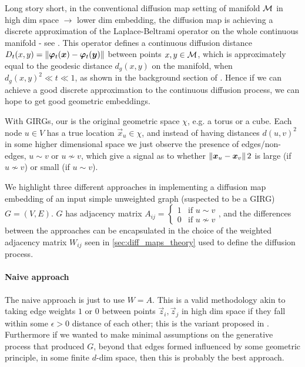 Long story short, in the conventional diffusion map setting of manifold $\mathcal{M}$ in high dim space $\to$ lower dim embedding, the diffusion map is achieving a discrete approximation of the Laplace-Beltrami operator on the whole continuous manifold - see \cite{singer2006graph}. This operator defines a continuous diffusion distance $D_t(x, y) = \left\lVert \bm{\varphi}_t(\bm{x}) - \bm{\varphi}_t(\bm{y})\right\rVert$ between points $x, y \in \mathcal{M}$, which is approximately equal to the geodesic distance $d_g(x, y)$ on the manifold, when $d_g(x, y)^2 \ll t \ll 1$, as shown in the background section of \cite{berry2018iterated}. Hence if we can achieve a good discrete approximation to the continuous diffusion process, we can hope to get good geometric embeddings.

With GIRGs, our  is the original geometric space $\chi$, e.g. a torus or a cube. Each node $u \in V$ has a true location $\vec{x}_u \in \chi$, and instead of having distances $d(u, v)^2$ in some higher dimensional space we just observe the presence of edges/non-edges, $u \sim v$ or $u \nsim v$, which give a signal as to whether $\left\lVert \bm{x}_u - \bm{x}_v\right\rVert2$ is large (if $u \nsim v$) or small (if $u \sim v$).

We highlight three different approaches in implementing a diffusion map embedding of an input simple unweighted graph (suspected to be a GIRG) $G=(V, E)$.
$G$ has adjacency matrix $A_{ij} = \begin{cases} 1 & \text{if } u \sim v \\ 0 & \text{if } u \nsim v \end{cases}$, and the differences between the approaches can be encapsulated in the choice of the weighted adjacency matrix $W_{ij}$ seen in \cref{sec:diff_maps_theory} used to define the diffusion process.

\paragraph{Naive approach}
The naive approach is just to use $W = A$. This is a valid methodology akin to taking edge weights $1$ or $0$ between points $\vec{z}_i, \vec{z}_j$ in high dim space if they fall within some $\epsilon > 0$ distance of each other; this is the  variant proposed in \cite{belkin2001laplacian}. Furthermore if we wanted to make minimal assumptions on the generative process that produced $G$, beyond that edges formed influenced by some geometric principle, in some finite $d$-dim space, then this is probably the best approach.

